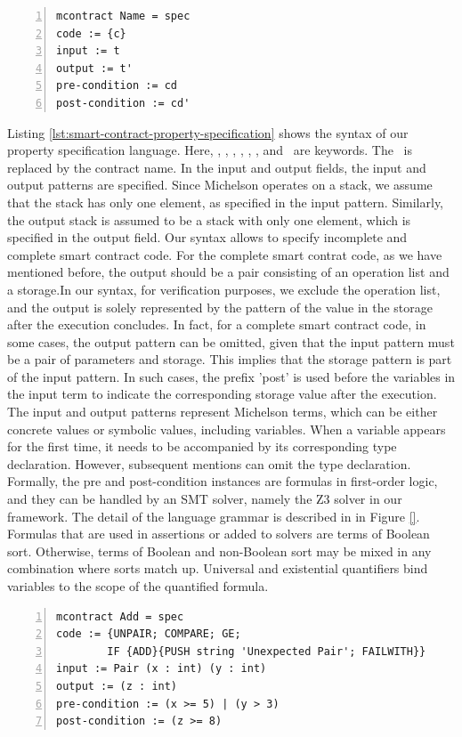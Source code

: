 \documentclass[a4paper,UKenglish,cleveref, autoref, thm-restate]{lipics-v2021}
\begin{document}
\begin{lstlisting}[float,captionpos=b,caption={Smart contract property specification},label={lst:smart-contract-property-specification},numbers=left]
mcontract Name = spec
code := {c}
input := t
output := t'
pre-condition := cd
post-condition := cd'
\end{lstlisting}
Listing \ref{lst:smart-contract-property-specification} shows the syntax of our property specification language. Here, \KMCONTRACT, \KWITH, \KCODE, \KINPUT, \KOUTPUT, \KPRECONDI, and \KPOSTCONDI\ are keywords. The \KNAME\ is replaced by the contract name. In the input and output fields, the input and output patterns are specified. Since Michelson operates on a stack, we assume that the stack has only one element, as specified in the input pattern. Similarly, the output stack is assumed to be a stack with only one element, which is specified in the output field. Our syntax allows to specify incomplete and complete smart contract code. For the complete smart contrat code, as we have mentioned before, the output should be a pair consisting of an operation list and a storage.In our syntax, for verification purposes, we exclude the operation list, and the output is solely represented by the pattern of the value in the storage after the execution concludes. In fact, for a complete smart contract code, in some cases, the output pattern can be omitted, given that the input pattern must be a pair of parameters and storage. This implies that the storage pattern is part of the input pattern. In such cases, the prefix 'post' is used before the variables in the input term to indicate the corresponding storage value after the execution.  The input and output patterns represent Michelson terms, which can be either concrete values or symbolic values, including variables. When a variable appears for the first time, it needs to be accompanied by its corresponding type declaration. However, subsequent mentions can omit the type declaration. Formally, the pre and post-condition instances are formulas in first-order logic, and they can be handled by an SMT solver, namely the Z3 solver in our framework. The detail of the language grammar is described in in Figure \ref{}. Formulas that are used in assertions or added to solvers are terms of Boolean sort. Otherwise, terms of Boolean and non-Boolean sort may be mixed in any combination where sorts match up. Universal and existential quantifiers bind variables to the scope of the quantified formula.
\begin{lstlisting}[float,captionpos=b,caption={The specification of Add contracr},label={lst:add-contract-specification},numbers=left]
mcontract Add = spec
code := {UNPAIR; COMPARE; GE; 
        IF {ADD}{PUSH string 'Unexpected Pair'; FAILWITH}}
input := Pair (x : int) (y : int)
output := (z : int)
pre-condition := (x >= 5) | (y > 3)
post-condition := (z >= 8)
\end{lstlisting}
\end{document}
